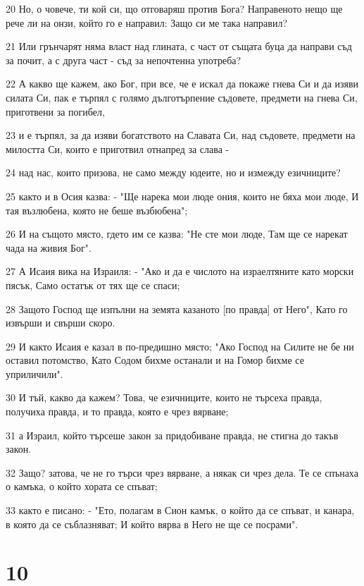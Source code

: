 \par 20 Но, о човече, ти кой си, що отговаряш против Бога? Направеното нещо ще рече ли на онзи, който го е направил: Защо си ме така направил?
\par 21 Или грънчарят няма власт над глината, с част от същата буца да направи съд за почит, а с друга част - съд за непочтенна употреба?
\par 22 А какво ще кажем, ако Бог, при все, че е искал да покаже гнева Си и да изяви силата Си, пак е търпял с голямо дълготърпение съдовете, предмети на гнева Си, приготвени за погибел,
\par 23 и е търпял, за да изяви богатството на Славата Си, над съдовете, предмети на милостта Си, които е приготвил отнапред за слава -
\par 24 над нас, които призова, не само между юдеите, но и измежду езичниците?
\par 25 както и в Осия казва: - "Ще нарека мои люде ония, които не бяха мои люде, И тая възлюбена, която не беше възбюбена";
\par 26 И на същото място, гдето им се казва: "Не сте мои люде, Там ще се нарекат чада на живия Бог".
\par 27 А Исаия вика на Израиля: - "Ако и да е числото на израелтяните като морски пясък, Само остатък от тях ще се спаси;
\par 28 Защото Господ ще изпълни на земята казаното [по правда] от Него", Като го извърши и свърши скоро.
\par 29 И както Исаия е казал в по-предишно място; "Ако Господ на Силите не бе ни оставил потомство, Като Содом бихме останали и на Гомор бихме се уприличили".
\par 30 И тъй, какво да кажем? Това, че езичниците, които не търсеха правда, получиха правда, и то правда, която е чрез вярване;
\par 31 а Израил, който търсеше закон за придобиване правда, не стигна до такъв закон.
\par 32 Защо? затова, че не го търси чрез вярване, а някак си чрез дела. Те се спънаха о камъка, о който хората се спъват;
\par 33 както е писано: - "Ето, полагам в Сион камък, о който да се спъват, и канара, в която да се съблазняват; И който вярва в Него не ще се посрами".

\chapter{10}

